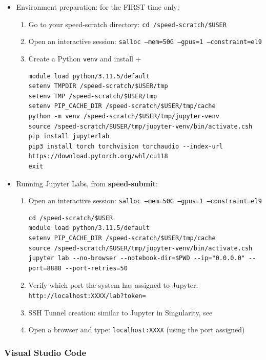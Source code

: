 \begin{itemize}
\item
Environment preparation: for the FIRST time only:
\begin{enumerate}
\item
Go to your speed-scratch directory: \texttt{cd /speed-scratch/\$USER}
\item
Open an interactive session: \texttt{salloc --mem=50G --gpus=1 --constraint=el9}
\item
Create a Python \texttt{venv} and install +
\scriptsize
\begin{verbatim}
module load python/3.11.5/default
setenv TMPDIR /speed-scratch/$USER/tmp
setenv TMP /speed-scratch/$USER/tmp
setenv PIP_CACHE_DIR /speed-scratch/$USER/tmp/cache
python -m venv /speed-scratch/$USER/tmp/jupyter-venv
source /speed-scratch/$USER/tmp/jupyter-venv/bin/activate.csh
pip install jupyterlab
pip3 install torch torchvision torchaudio --index-url https://download.pytorch.org/whl/cu118
exit
\end{verbatim}
\normalsize
\end{enumerate}
\item
Running Jupyter Labs, from \textbf{speed-submit}:
\begin{enumerate}
\item
Open an interactive session: \texttt{salloc --mem=50G --gpus=1 --constraint=el9} 
\scriptsize
\begin{verbatim}
cd /speed-scratch/$USER
module load python/3.11.5/default
setenv PIP_CACHE_DIR /speed-scratch/$USER/tmp/cache
source /speed-scratch/$USER/tmp/jupyter-venv/bin/activate.csh
jupyter lab --no-browser --notebook-dir=$PWD --ip="0.0.0.0" --port=8888 --port-retries=50
\end{verbatim}
\normalsize
\item
Verify which port the system has assigned to Jupyter:\\
\texttt{http://localhost:XXXX/lab?token=}
\item
SSH Tunnel creation: similar to Jupyter in Singularity, see 
\item
Open a browser and type: \texttt {localhost:XXXX} (using the port assigned)
\end{enumerate}
\end{itemize}


\subsubsection{Visual Studio Code}
\label{sect:vscode}

